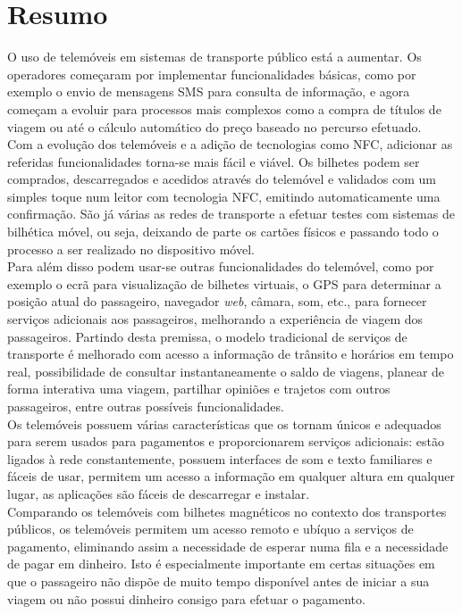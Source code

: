 \section{Resumo}

O uso de telemóveis em sistemas de transporte público está a aumentar. Os operadores começaram por implementar funcionalidades básicas, como por exemplo o envio de mensagens SMS para consulta de informação, e agora começam a evoluir para processos mais complexos como a compra de títulos de viagem ou até o cálculo automático do preço baseado no percurso efetuado.
\\Com a evolução dos telemóveis e a adição de tecnologias como NFC, adicionar as referidas funcionalidades torna-se mais fácil e viável. Os bilhetes podem ser comprados, descarregados e acedidos através do telemóvel e validados com um simples toque num leitor com tecnologia NFC, emitindo automaticamente uma confirmação. São já várias as redes de transporte a efetuar testes com sistemas de bilhética móvel, ou seja, deixando de parte os cartões físicos e passando todo o processo a ser realizado no dispositivo móvel.
\\Para além disso podem usar-se outras funcionalidades do telemóvel, como por exemplo o ecrã para visualização de bilhetes virtuais, o GPS para determinar a posição atual do passageiro, navegador \textit{web}, câmara, som, etc., para fornecer serviços adicionais aos passageiros, melhorando a experiência de viagem dos passageiros. Partindo desta premissa, o modelo tradicional de serviços de transporte é melhorado com acesso a informação de trânsito e horários em tempo real, possibilidade de consultar instantaneamente o saldo de viagens, planear de forma interativa uma viagem, partilhar opiniões e trajetos com outros passageiros, entre outras possíveis funcionalidades.\cite{Nunes2011}
\\Os telemóveis possuem várias características que os tornam únicos e adequados para serem usados para pagamentos e proporcionarem serviços adicionais: estão ligados à rede constantemente, possuem interfaces de som e texto familiares e fáceis de usar, permitem um acesso a informação em qualquer altura em qualquer lugar, as aplicações são fáceis de descarregar e instalar.
\\Comparando os telemóveis com bilhetes magnéticos no contexto dos transportes públicos, os telemóveis permitem um acesso remoto e ubíquo a serviços de pagamento, eliminando assim a necessidade de esperar numa fila e a necessidade de pagar em dinheiro. Isto é especialmente importante em certas situações em que o passageiro não dispõe de muito tempo disponível antes de iniciar a sua viagem ou não possui dinheiro consigo para efetuar o pagamento.\cite{Mallat2007}
